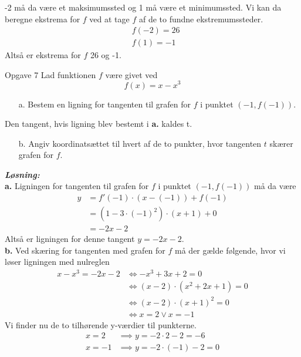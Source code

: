 \documentclass{article}
\newcommand{\sol}{\setlength{\parindent}{0cm}\textbf{\textit{Løsning:}}\setlength{\parindent}{1cm}}
\begin{document}
-2 må da være et maksimumssted og 1 må være et minimumssted.
Vi kan da beregne ekstrema for $f$ ved at tage $f$ af de to fundne ekstremumssteder. 
\begin{equation*}
\begin{split}
  &f(-2)=26\\ 
  &f(1)=-1
\end{split}
\end{equation*}
Altså er ekstrema for $f$ 26 og -1. 
\begin{question}{Opgave 7}{}
  Lad funktionen $f$ være givet ved
  \[
  f(x)=x-x^3
  \] 
  \begin{itemize}
    \item[a.] Bestem en ligning for tangenten til grafen for $f$ i punktet $\left(-1,f(-1)\right)$.
  \end{itemize}
  Den tangent, hvis ligning blev bestemt i \textbf{a.} kaldes t.
  \begin{itemize}
    \item[b.] Angiv koordinatsættet til hvert af de to punkter, hvor tangenten $t$ skærer grafen for $f$. 
  \end{itemize}
\end{question}
\sol \\
\textbf{a.}
Ligningen for tangenten til grafen for $f$ i punktet $\left(-1,f(-1)\right)$ må da være
\begin{equation*}
\begin{split}
  y&=f'(-1)\cdot (x-(-1))+f(-1)\\ 
  &=\left(1-3 \cdot (-1)^2\right) \cdot (x+1)+0\\ 
  &=-2x-2
\end{split}
\end{equation*}
Altså er ligningen for denne tangent $y=-2x-2$.\\[1ex]
\textbf{b.}
Ved skæring for tangenten med grafen for $f$ må der gælde følgende, hvor vi løser ligningen med nulreglen
\begin{equation*}
\begin{split}
  x-x^3=-2x-2 &\iff -x^3+3x+2=0\\ 
  &\iff (x-2)\cdot (x^2+2x+1)=0\\ 
  &\iff (x-2) \cdot (x+1)^2=0\\
  &\iff x=2 \lor x=-1
\end{split}
\end{equation*}
Vi finder nu de to tilhørende y-værdier til punkterne.
\begin{equation*}
\begin{split}
  x=2 &\implies y=-2 \cdot 2 -2=-6\\ 
  x=-1 &\implies y=-2 \cdot (-1)-2=0
\end{split}
\end{equation*}
\end{document}

